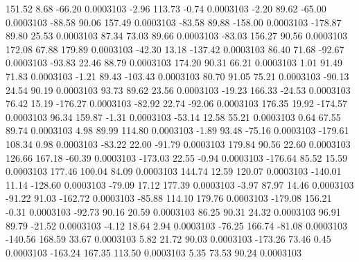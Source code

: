       151.52        8.68      -66.20     0.0003103
       -2.96      113.73       -0.74     0.0003103
       -2.20       89.62      -65.00     0.0003103
      -88.58       90.06      157.49     0.0003103
      -83.58       89.88     -158.00     0.0003103
     -178.87       89.80       25.53     0.0003103
       87.34       73.03       89.66     0.0003103
      -83.03      156.27       90.56     0.0003103
      172.08       67.88      179.89     0.0003103
      -42.30       13.18     -137.42     0.0003103
       86.40       71.68      -92.67     0.0003103
      -93.83       22.46       88.79     0.0003103
      174.20       90.31       66.21     0.0003103
        1.01       91.49       71.83     0.0003103
       -1.21       89.43     -103.43     0.0003103
       80.70       91.05       75.21     0.0003103
      -90.13       24.54       90.19     0.0003103
       93.73       89.62       23.56     0.0003103
      -19.23      166.33      -24.53     0.0003103
       76.42       15.19     -176.27     0.0003103
      -82.92       22.74      -92.06     0.0003103
      176.35       19.92     -174.57     0.0003103
       96.34      159.87       -1.31     0.0003103
      -53.14       12.58       55.21     0.0003103
        0.64       67.55       89.74     0.0003103
        4.98       89.99      114.80     0.0003103
       -1.89       93.48      -75.16     0.0003103
     -179.61      108.34        0.98     0.0003103
      -83.22       22.00      -91.79     0.0003103
      179.84       90.56       22.60     0.0003103
      126.66      167.18      -60.39     0.0003103
     -173.03       22.55       -0.94     0.0003103
     -176.64       85.52       15.59     0.0003103
      177.46      100.04       84.09     0.0003103
      144.74       12.59      120.07     0.0003103
     -140.01       11.14     -128.60     0.0003103
      -79.09       17.12      177.39     0.0003103
       -3.97       87.97       14.46     0.0003103
      -91.22       91.03     -162.72     0.0003103
      -85.88      114.10      179.76     0.0003103
     -179.08      156.21       -0.31     0.0003103
      -92.73       90.16       20.59     0.0003103
       86.25       90.31       24.32     0.0003103
       96.91       89.79      -21.52     0.0003103
       -4.12       18.64        2.94     0.0003103
      -76.25      166.74      -81.08     0.0003103
     -140.56      168.59       33.67     0.0003103
        5.82       21.72       90.03     0.0003103
     -173.26       73.46        0.45     0.0003103
     -163.24      167.35      113.50     0.0003103
        5.35       73.53       90.24     0.0003103
